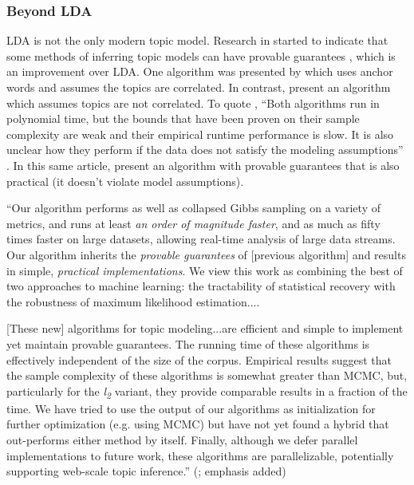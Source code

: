 

\subsubsection{Beyond LDA}
LDA is not the only modern topic model. Research in \citeyear{arora2012learning} started to indicate that some methods of inferring topic models can have provable guarantees \citep{arora2012learning}, which is an improvement over LDA. One algorithm was presented by \cite{arora2012learning} which uses anchor words and assumes the topics are correlated. In contrast, \cite{anandkumar2012spectral} present an algorithm which assumes topics are not correlated. To quote \cite{arora2012learning}, ``Both algorithms run in polynomial time, but the bounds that have been proven on their sample complexity are weak and their empirical runtime performance is slow. It is also unclear how they perform if the data does not satisfy the modeling assumptions'' \citep{arora2013practical}. In this same article, \citeauthor{arora2013practical} present an algorithm with provable guarantees that is also practical (it doesn't violate model assumptions).

\begin{displayquote}
``Our algorithm performs as well as collapsed Gibbs sampling on a variety of metrics, and runs at least \textit{an order of magnitude faster}, and as much as fifty times faster on large datasets, allowing real-time analysis of large data streams. Our algorithm inherits the \textit{provable guarantees} of [previous algorithm] and results in simple, \textit{practical implementations}. We view this work as combining the best of two approaches to machine learning: the tractability of statistical recovery with the robustness of maximum likelihood estimation....

[These new] algorithms for topic modeling...are efficient and simple to implement yet maintain provable guarantees. The running time of these algorithms is effectively independent of the size of the corpus. Empirical results suggest that the sample complexity of these algorithms is somewhat greater than MCMC, but, particularly for the \textit{l\textsubscript{2}} variant, they provide comparable results in a fraction of the time. We have tried to use the output of our algorithms as initialization for further optimization (e.g. using MCMC) but have not yet found a hybrid that out-performs either method by itself. Finally, although we defer parallel implementations to future work, these algorithms are parallelizable, potentially supporting web-scale topic inference.'' (\citealp{arora2013practical}; emphasis added)
\end{displayquote}

